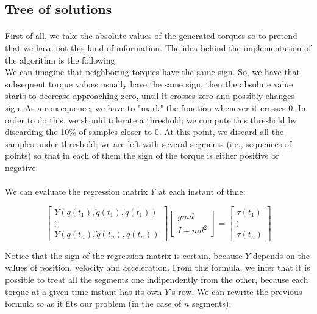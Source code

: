 \documentclass{article}
\begin{document}
\subsection{Tree of solutions}
\paragraph{}First of all, we take the absolute values of the generated torques so to pretend that we have not this kind of information. The idea behind the implementation of the algorithm is the following.\\

We can imagine that neighboring torques have the same sign. So, we have that subsequent torque values usually have the same sign, then the absolute value starts to decrease approaching zero, until it crosses zero and possibly changes sign. As a consequence, we have to "mark" the function whenever it crosses 0. In order to do this, we should tolerate a threshold; we compute this threshold by discarding the 10\% of samples closer to 0. At this point, we discard all the samples under threshold; we are left with several segments (i.e.,  sequences of points) so that in each of them the sign of the torque is either positive or negative.

\paragraph{}We can evaluate the regression matrix $Y$ at each instant of time:

\vspace{1em}
\[\begin{bmatrix}
Y(q(t_1),\dot{q}(t_1),\ddot{q}(t_1))\\
\vdots \\
Y(q(t_n),\dot{q}(t_n),\ddot{q}(t_n))
\end{bmatrix} \begin{bmatrix}
gmd \\ I +md^2
\end{bmatrix} = \begin{bmatrix}
\tau(t_1)\\
\vdots \\
\tau(t_n)
\end{bmatrix} \]
\vspace{1em}

Notice that the sign of the regression matrix is certain, because $Y$ depends on the values of position, velocity and acceleration. From this formula, we infer that it is possible to treat all the segments one indipendently from the other, because each torque at a given time instant has its own $Y$'s row. We can rewrite the previous formula so as it fits our problem (in the case of $n$ segments):
\end{document}
